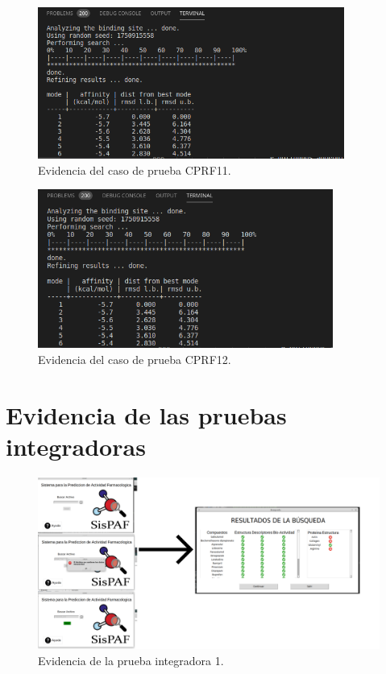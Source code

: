 \begin{figure}[H]
    \centering
    \includegraphics[scale=1.05]{Anexo/imagenes/Imagenes_Pruebas/CPRF11.png}
    \caption{Evidencia del caso de prueba CPRF11.}
    \label{CPRF11}
\end{figure}

\begin{figure}[H]
    \centering
    \includegraphics[scale=1.1]{Anexo/imagenes/Imagenes_Pruebas/CPRF12.png}
    \caption{Evidencia del caso de prueba CPRF12.}
    \label{CPRF12}
\end{figure}


\section{Evidencia de las pruebas integradoras}

\begin{figure}[H]
    \centering
    \includegraphics[scale=0.17]{Anexo/imagenes/Imagenes_Pruebas/M1Integracion.png}
    \caption{Evidencia de la prueba integradora 1.}
    \label{M1Integradora}
\end{figure}

